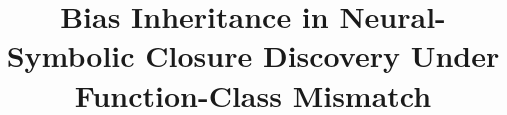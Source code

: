 \documentclass[11pt]{article}
\title{Bias Inheritance in Neural-Symbolic Closure Discovery Under Function-Class Mismatch}
\author{}
\date{}
\begin{document}
\maketitle










\nocite{*}



\appendix

\end{document}
